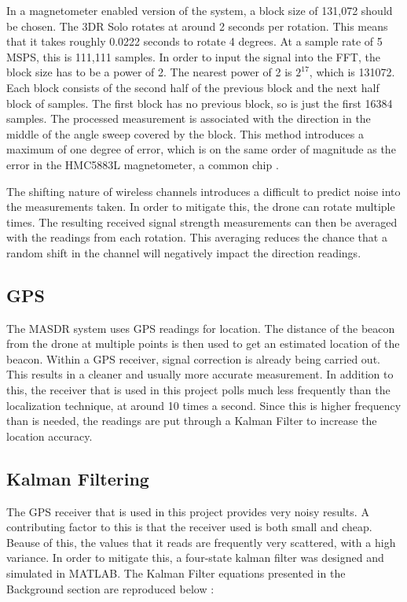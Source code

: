 In a magnetometer enabled version of the system, a block size of 131,072 should be chosen. The 3DR Solo rotates at around 2 seconds per rotation. This means that it takes roughly 0.0222 seconds to rotate 4 degrees. At a sample rate of 5 MSPS, this is 111,111 samples. In order to input the signal into the FFT, the block size has to be a power of 2. The nearest power of 2 is $2^{17}$, which is 131072. Each block consists of the second half of the previous block and the next half block of samples. The first block has no previous block, so is just the first 16384 samples. The processed measurement is associated with the direction in the middle of the angle sweep covered by the block. This method introduces a maximum of one degree of error, which is on the same order of magnitude as the error in the HMC5883L magnetometer, a common chip \cite{magnetometer_data}. \par 
The shifting nature of wireless channels introduces a difficult to predict noise into the measurements taken. In order to mitigate this, the drone can rotate multiple times. The resulting received signal strength measurements can then be averaged with the readings from each rotation. This averaging reduces the chance that a random shift in the channel will negatively impact the direction readings. \par 
\subsection{GPS}
The MASDR system uses GPS readings for location. The distance of the beacon from the drone at multiple points is then used to get an estimated location of the beacon. Within a GPS receiver, signal correction is already being carried out. This results in a cleaner and usually more accurate measurement. In addition to this, the receiver that is used in this project polls much less frequently than the localization technique, at around 10 times a second. Since this is higher frequency than is needed, the readings are put through a Kalman Filter to increase the location accuracy. \par 
\subsection{Kalman Filtering}\label{methods:kf}
The GPS receiver that is used in this project provides very noisy results. A contributing factor to this is that the receiver used is both small and cheap. Beause of this, the values that it reads are frequently very scattered, with a high variance. In order to mitigate this, a four-state kalman filter was designed and simulated in MATLAB. The Kalman Filter equations presented in the Background section are reproduced below \cite{kf_book}: \par
